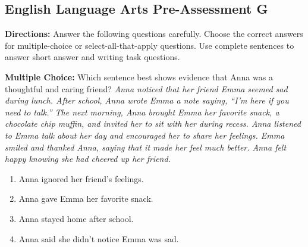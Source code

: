 \documentclass[12pt]{article}
\begin{document}
\subsection*{English Language Arts Pre-Assessment G}
\onehalfspacing

\begin{tcolorbox}[colframe=black!50, colback=white, title=Assessment Girections]
\textbf{Directions:} Answer the following questions carefully. Choose the correct answers for multiple-choice or select-all-that-apply questions. Use complete sentences to answer short answer and writing task questions.
\end{tcolorbox}

\begin{tcolorbox}[colframe=black!50, colback=white, title=Question 1]
\textbf{Multiple Choice:} Which sentence best shows evidence that Anna was a thoughtful and caring friend?  
\textit{Anna noticed that her friend Emma seemed sad during lunch. After school, Anna wrote Emma a note saying, “I’m here if you need to talk.” The next morning, Anna brought Emma her favorite snack, a chocolate chip muffin, and invited her to sit with her during recess. Anna listened to Emma talk about her day and encouraged her to share her feelings. Emma smiled and thanked Anna, saying that it made her feel much better. Anna felt happy knowing she had cheered up her friend.}  
\begin{enumerate}[label=(\Alph*)]
\item Anna ignored her friend’s feelings.  
\item Anna gave Emma her favorite snack.  
\item Anna stayed home after school.  
\item Anna said she didn’t notice Emma was sad.  
\end{enumerate}
\end{tcolorbox}
\end{document}
